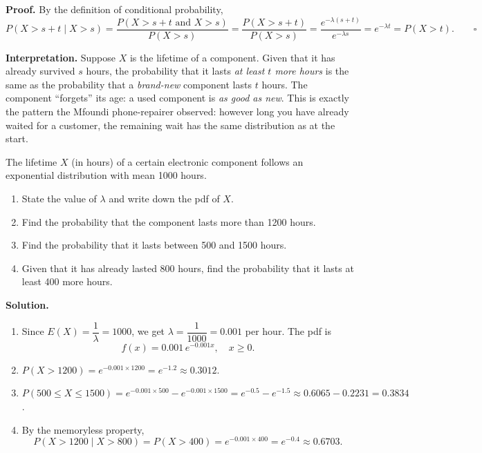 \documentclass[11pt]{article}
\begin{document}
\textbf{Proof.} By the definition of conditional probability,
\[
P(X > s+t \mid X > s) = \frac{P(X > s+t \text{ and } X > s)}{P(X > s)} = \frac{P(X > s+t)}{P(X > s)} = \frac{e^{-\lambda(s+t)}}{e^{-\lambda s}} = e^{-\lambda t} = P(X > t). \qquad \square
\]

\textbf{Interpretation.} Suppose $X$ is the lifetime of a component. Given that it has already survived $s$ hours, the probability that it lasts \emph{at least $t$ more hours} is the same as the probability that a \emph{brand-new} component lasts $t$ hours. The component ``forgets'' its age: a used component is \emph{as good as new}. This is exactly the pattern the Mfoundi phone-repairer observed: however long you have already waited for a customer, the remaining wait has the same distribution as at the start.

\begin{exoresolu}
The lifetime $X$ (in hours) of a certain electronic component follows an exponential distribution with mean 1000 hours.
\begin{enumerate}
\item[(a)] State the value of $\lambda$ and write down the pdf of $X$.
\item[(b)] Find the probability that the component lasts more than 1200 hours.
\item[(c)] Find the probability that it lasts between 500 and 1500 hours.
\item[(d)] Given that it has already lasted 800 hours, find the probability that it lasts at least 400 more hours.
\end{enumerate}
\tcblower
\textbf{Solution.}
\begin{enumerate}
\item[(a)] Since $E(X) = \dfrac{1}{\lambda} = 1000$, we get $\lambda = \dfrac{1}{1000} = 0.001$ per hour. The pdf is
\[ f(x) = 0.001\,e^{-0.001x}, \quad x \ge 0. \]
\item[(b)] $P(X > 1200) = e^{-0.001 \times 1200} = e^{-1.2} \approx 0.3012$.
\item[(c)] $P(500 \le X \le 1500) = e^{-0.001 \times 500} - e^{-0.001 \times 1500} = e^{-0.5} - e^{-1.5} \approx 0.6065 - 0.2231 = 0.3834$.
\item[(d)] By the memoryless property,
\[ P(X > 1200 \mid X > 800) = P(X > 400) = e^{-0.001 \times 400} = e^{-0.4} \approx 0.6703. \]
\end{enumerate}
\end{exoresolu}
\end{document}
